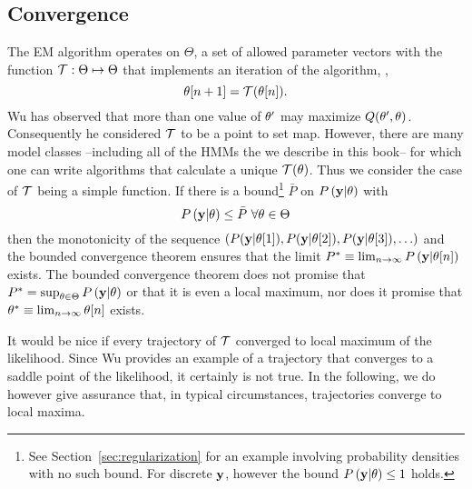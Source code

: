 \subsection{Convergence}


\newcommand{\EMmap}{{\cal T}} %
The EM algorithm operates on $\Theta$, a set of allowed parameter
vectors with the function $\EMmap:\Theta \mapsto \Theta$ that
implements an iteration of the algorithm, \ie,
\begin{equation*}
  \ti{\parameters}{n+1} = \EMmap (\ti{\parameters}{n}).
\end{equation*}
Wu\cite{Wu83} has observed that more than one value of $\theta'$
may maximize $Q(\theta',\theta)$.  Consequently he
considered $\EMmap$ to be a point to set map.  However, there are many
model classes --including all of the HMMs the we describe in this
book-- for which one can write algorithms that calculate a unique
$\EMmap(\theta)$.  Thus we consider the case of $\EMmap$ being a
simple function.  If there is a bound\footnote{See
  Section~\ref{sec:regularization} for an example involving
  probability densities with no such bound.  For discrete $\mathbf{y}$,
  however the bound $ P \left(\mathbf{y}|\theta \right) \leq 1$ holds.}
$\bar P$ on $ P \left(\mathbf{y}|\theta \right) $ with
\begin{equation*}
   P \left(\mathbf{y}|\theta \right) \leq \bar P ~ \forall \theta \in \Theta
\end{equation*}
then the monotonicity of the sequence $\left(
  P(\mathbf{y}|{\theta}{[1]}),
  P(\mathbf{y}|{\theta}{[2]}), P(\mathbf{y}|{\theta}{[3]}), \ldots \right)$ and the bounded
convergence theorem ensures that the limit $ P^* \equiv
\lim_{n\rightarrow \infty} P \left(\mathbf{y} |{\theta}{[n]} \right) $
exists.  The bounded convergence theorem does not promise that $P^* =
\sup_{\theta \in \Theta} P \left(\mathbf{y} | \theta \right)$ or
that it is even a local maximum, nor does it promise that $\theta^*
\equiv \lim_{n \rightarrow \infty} {\theta}{[n]}$ exists.

It would be nice if every trajectory of $\EMmap$ converged to local
maximum of the likelihood.  Since Wu\cite{Wu83} provides an example of
a trajectory that converges to a saddle point of the likelihood, it
certainly is not true.  In the following, we do however give assurance
that, in typical circumstances, trajectories converge to local maxima.

